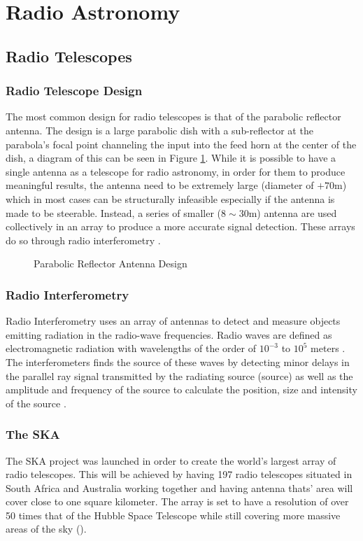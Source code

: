 \section{Radio Astronomy}\label{ra}
\subsection{Radio Telescopes}\label{ra:sec:rt}
%
\subsubsection{Radio Telescope Design}
The most common design for radio telescopes is that of the parabolic reflector antenna. The design is a large parabolic dish with a sub-reflector at the parabola's focal point channeling the input into the feed horn at the center of the dish, a diagram of this can be seen in Figure \ref{ra:fig:para}. While it is possible to have a single antenna as a telescope for radio astronomy, in order for them to produce meaningful results, the antenna need to be extremely large (diameter of $+70$m) which in most cases can be structurally infeasible especially if the antenna is made to be steerable. Instead, a series of smaller ($8\sim30$m) antenna are used collectively in an array to produce a more accurate signal detection. These arrays do so through radio interferometry \citep{cheng2009radio}.
%
\begin{figure}[H]
	\centering
	\caption{Parabolic Reflector Antenna Design \citep{telescope}}
	\label{ra:fig:para}
\end{figure}
%
\subsubsection{Radio Interferometry}\label{ra:ssec:des}
Radio Interferometry uses an array of antennas to detect and measure objects emitting radiation in the radio-wave frequencies. Radio waves are defined as electromagnetic radiation with wavelengths of the order of $10^{-3}$ to $10^5$ meters \citep{cheng2009radio}. The interferometers finds the source of these waves by detecting minor delays in the parallel ray signal transmitted by the radiating source (source) as well as the amplitude and frequency of the source to calculate the position, size and intensity of the source \citep{thompson2008interferometry}.
%
\subsubsection{The SKA}
The SKA project was launched in order to create the world's largest array of radio telescopes. This will be achieved by having 197 radio telescopes situated in South Africa and Australia working together and having antenna thats' area will cover close to one square kilometer. The array is set to have a resolution of over 50 times that of the Hubble Space Telescope while still covering more massive areas of the sky (\cite{SKAsite}).
